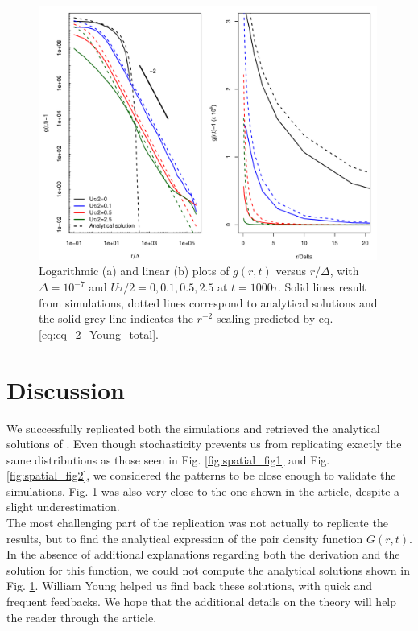 \begin{figure}[H]
\begin{center}
 \includegraphics[width=0.99\textwidth]{../code/simulation/pcf_test_Utot_modif_dx_dp.pdf}
 \caption{Logarithmic (a) and linear (b) plots of $g(r,t)$ versus $r/\Delta$, with $\Delta=10^{-7}$ and $U\tau/2=0,0.1,0.5,2.5$ at $t=1000\tau$. Solid lines result from simulations, dotted lines correspond to analytical solutions and the solid grey line indicates the $r^{-2}$ scaling predicted by eq. \ref{eq:eq_2_Young_total}.}
  \label{fig:pcf_Fig3}
\end{center}
  \end{figure} 
 
\section*{Discussion}

We successfully replicated both the simulations and retrieved the analytical solutions of \citep{young_reproductive_2001}. Even though stochasticity prevents us from replicating exactly the same distributions as those seen in Fig. \ref{fig:spatial_fig1} and Fig. \ref{fig:spatial_fig2}, we considered the patterns to be close enough to validate the simulations. Fig. \ref{fig:pcf_Fig3} was also very close to the one shown in the article, despite a slight underestimation.\\

The most challenging part of the replication was not actually to replicate the results, but to find the analytical expression of the pair density function $G(r,t)$. In the absence of additional explanations regarding both the derivation and the solution for this function, we could not compute the analytical solutions shown in Fig. \ref{fig:pcf_Fig3}. William Young helped us find back these solutions, with quick and frequent feedbacks. We hope that the additional details on the theory will help the reader through the article. \\

